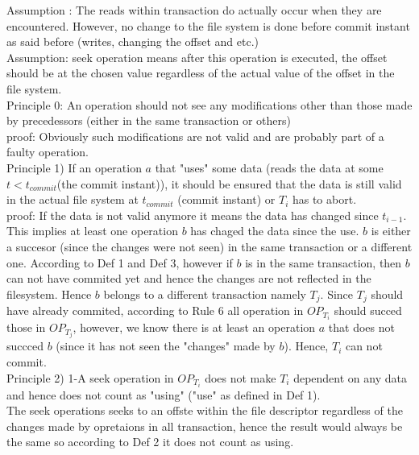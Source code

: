 \documentclass[a4paper, 11pt]{article}
\begin{document}
Assumption : The reads within transaction do actually occur when they are encountered. However, no change to the file system is done before commit instant as said before (writes, changing the offset and etc.)\\


Assumption: seek operation means after this operation is executed, the offset should be at the chosen value regardless of the actual value of the offset in the file system.\\

Principle 0: An operation should not see any modifications other than those made by precedessors (either in the same transaction or others)\\

proof: Obviously such modifications are not valid and are probably part of a faulty operation.\\


Principle 1) If an operation $a$ that "uses" some data (reads the data at some $t < t_{commit}$(the commit instant)), it should be ensured that the data is still valid in the actual file system at $t_{commit}$ (commit instant) or $T_i$ has to abort.\\

proof: If the data is not valid anymore it means the data has changed since $t_{i-1}$. This implies at least one operation $b$ has chaged the data since the use. $b$ is either a succesor (since the changes were not seen) in the same transaction or a different one. According to Def 1 and Def 3, however if $b$ is in the same transaction, then $b$ can not have commited yet and hence the changes are not reflected in the filesystem. Hence $b$ belongs to a different transaction namely $T_j$. Since $T_j$ should have already commited, according to Rule 6 all operation in $OP_{T_i}$ should succed those in $OP_{T_j}$, however, we know there is at least an operation $a$ that does not succced $b$ (since it has not seen the "changes" made by $b$). Hence, $T_i$ can not commit.\\


Principle 2) 1-A seek operation in $OP_{T_i}$ does not make $T_i$ dependent on any data and hence does not count as "using" ("use" as defined in Def 1).\\

The seek operations seeks to an offste within the file descriptor regardless of the changes made by opretaions in all transaction, hence the result would always be the same so according to Def 2 it does not count as using.\\ 
\end{document}

